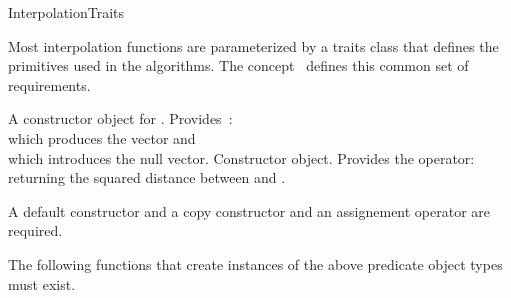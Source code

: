 

\begin{ccRefConcept}{InterpolationTraits}


\ccDefinition
  
Most interpolation functions are parameterized by a traits class that
defines the primitives used in the algorithms.  The concept
\ccRefName\ defines this common set of requirements.  


\ccTypes {}
 {A constructor object for
  .
  Provides~: \\
   which produces the vector
   and \\
   which introduces
  the null vector.}
 {Constructor
  object. Provides the operator:\\
   returning the squared
  distance between  and .}

\ccCreation
{}  %
A default constructor and a copy constructor
 and an assignement operator are required. 

\ccOperations
{}
The following functions that create instances of the above predicate object
types must exist.


\end{ccRefConcept}
